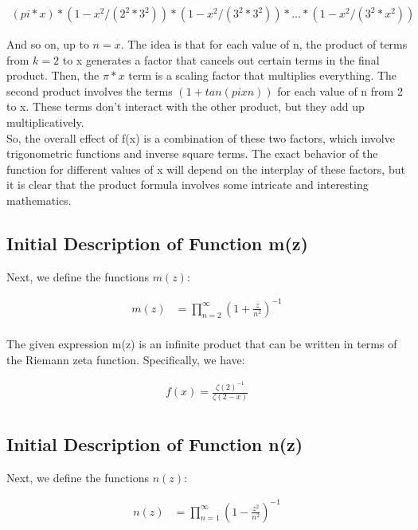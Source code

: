 \documentclass{article}
\begin{document}
\begin{align*}
(pi*x) * (1 - x^2 / (2^2 * 3^2)) * (1 - x^2 / (3^2 * 3^2)) * ... * (1 - x^2 / (3^2 * x^2))
\end{align*}

And so on, up to $n=x$. The idea is that for each value of n, the product of terms from $k=2$ to x generates a factor that cancels out certain terms in the final product. Then, the $\pi*x$ term is a scaling factor that multiplies everything. The second product involves the terms $(1 + tan(pixn))$ for each value of n from 2 to x. These terms don't interact with the other product, but they add up multiplicatively. \\

So, the overall effect of f(x) is a combination of these two factors, which involve trigonometric functions and inverse square terms. The exact behavior of the function for different values of x will depend on the interplay of these factors, but it is clear that the product formula involves some intricate and interesting mathematics. \\

\subsection*{Initial Description of Function m(z)}
Next, we define the functions $m(z)$:

\begin{align*}
m(z) &= \prod_{n=2}^\infty \left(1 + \frac{z}{n^2}\right)^{-1} \\
\end{align*}

The given expression m(z) is an infinite product that can be written in terms of the Riemann zeta function. Specifically, we have:

\begin{align*}
f(x) = \frac{\zeta\left(2\right)^{-1}}{\zeta\left(2-x\right)} \\
\end{align*}


\subsection*{Initial Description of Function n(z)}
Next, we define the functions $n(z)$:

\begin{align*}
n(z) &= \prod_{n=1}^\infty \left(1 - \frac{z^2}{n^2}\right)^{-1} \\
\end{align*}
\end{document}
